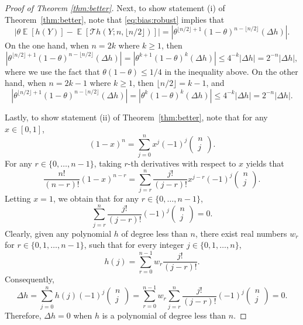 \documentclass[12pt,letterpaper]{article}
\newcommand{\com}[2]{
  \left(\begin{array}{cc}
    #1 \\ #2
  \end{array}\right)
}
\newcommand{\E}{\operatorname{\mathbb{E}}}
\newcommand{\T}{\mathcal{T}}
\begin{document}
\begin{proof}[Proof of Theorem \ref{thm:better}]
Next, to show statement (i) of Theorem~\ref{thm:better}, note that \eqref{eq:bias:robust} implies that 
\begin{equation}\label{eq:bias:robust:abs}
\left|\theta \E[h(Y)] - \E[\T h(Y; n, \lfloor n/2\rfloor)]\right|= \left|\theta^{\lfloor n/2\rfloor+1} (1 - \theta)^{n-\lfloor n/2\rfloor} (\Delta h)\right|.
\end{equation}
On the one hand, when $n=2k$ where $k\geq1$, then 
$$\left|\theta^{\lfloor n/2\rfloor+1} (1 - \theta)^{n-\lfloor n/2\rfloor} (\Delta h)\right|=|\theta^{k+1}(1-\theta)^k(\Delta h)|\leq{4}^{-k}|\Delta h|=2^{-n}|\Delta h|,$$
where we use the fact that $\theta(1-\theta)\leq1/4$ in the inequality above. On the other hand, when $n=2k-1$ where $k\geq1$, then $\lfloor n/2\rfloor=k-1$, and 
$$\left|\theta^{\lfloor n/2\rfloor+1} (1 - \theta)^{n-\lfloor n/2\rfloor} (\Delta h)\right|=|\theta^{k}(1-\theta)^k(\Delta h)|\leq{4}^{-k}|\Delta h|=2^{-n}|\Delta h|.$$

Lastly, to show statement (ii) of Theorem~\ref{thm:better}, note that for any $x\in [0, 1]$,
  \[(1 - x)^{n} = \sum_{j=0}^{n}x^j(-1)^{j}\com{n}{j}.\]
  For any $r \in \{0, \ldots, n-1\}$, taking $r$-th derivatives with respect to $x$ yields that
  \[\frac{n!}{(n-r)!}(1 - x)^{n-r} = \sum_{j=r}^{n}\frac{j!}{(j-r)!}x^{j-r}(-1)^{j}\com{n}{j}.\]
  Letting $x = 1$, we obtain that for any $r\in\{0,\ldots,n-1\}$,
  \[\sum_{j=r}^{n}\frac{j!}{(j-r)!}(-1)^{j}\com{n}{j}=0.\]
  Clearly, given any polynomial $h$ of degree less than $n$, there exist real numbers $w_r$ for $r\in\{0,1,\ldots,n-1\}$, such that for every integer $j\in\{0,1,\ldots,n\}$,
  $$h(j) = \sum_{r=0}^{n-1} w_r\frac{j!}{(j-r)!}.$$
  Consequently,
  $$\Delta h = \sum_{j=0}^{n}h(j)(-1)^{j}\com{n}{j}=\sum_{r=0}^{n-1} w_r\sum_{j=r}^{n}\frac{j!}{(j-r)!}(-1)^{j}\com{n}{j}=0.$$
  Therefore, $\Delta h = 0$ when $h$ is a polynomial of degree less than $n$. 
\end{proof}
\end{document}
